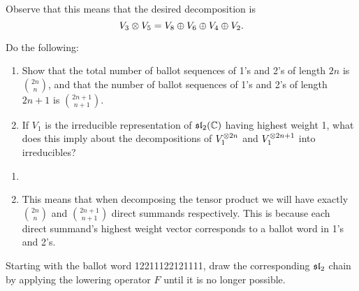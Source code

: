 \documentclass[12pt]{memoir}
\begin{document}
\begin{ptcbr}
\begin{center}
    \end{center}
    Observe that this means that the desired decomposition is
    $$V_3\otimes V_5=V_8\oplus V_6\oplus V_4\oplus V_2.$$
\end{ptcbr}
\begin{Ej}
    Do the following:
    \begin{enumerate}
        \item Show that the total number of ballot sequences of 1's and 2's of length $2n$ is $\binom{2n}{n}$, and
        that the number of ballot sequences of 1's and 2's of length $2n + 1$ is $\binom{2n+1}{n+1}$.
        \item If $V_1$ is the irreducible representation of $\mathfrak{sl}_2(\mathbb{C})$ having highest weight 1, what does this
        imply about the decompositions of $V_1^{\otimes 2n}$ and $V_1^{\otimes 2n+1}$ into irreducibles?
    \end{enumerate}
\end{Ej}
\begin{ptcbr}
    \begin{enumerate}
        \item {}
        \item This means that when decomposing the tensor product we will have exactly $\binom{2n}{n}$ and $\binom{2n+1}{n+1}$ direct summands respectively. This is because each direct summand's highest weight vector corresponds to a ballot word in 1's and 2's.
    \end{enumerate}
\end{ptcbr}
\begin{Ej}
    Starting with the ballot word 12211122121111, draw the corresponding $\mathfrak{sl}_2$ chain by applying the lowering operator $F$ until it is no longer possible.
\end{Ej}
\end{document}
